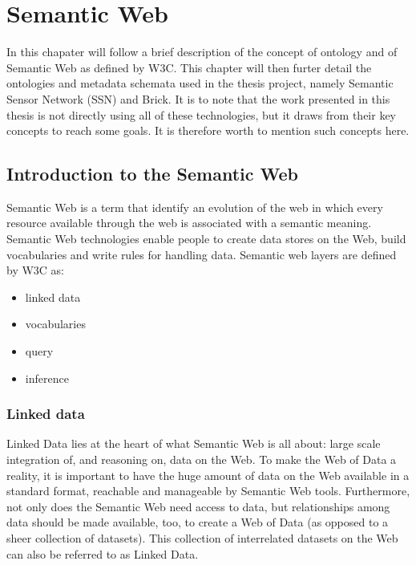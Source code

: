 \chapter{Semantic Web}
\label{ch:semantic_web}

\nocite{rdf_introduction}
In this chapater will follow a brief description of the concept of ontology and of Semantic Web as defined by W3C. This chapter will then furter detail the ontologies and metadata schemata used in the thesis project, namely Semantic Sensor Network (SSN) and Brick.
It is to note that the work presented in this thesis is not directly using all of these technologies, but it draws from their key concepts to reach some goals. It is therefore worth to mention such concepts here.

\section{Introduction to the Semantic Web}
Semantic Web is a term that identify an evolution of the web in which every resource available through the web is associated with a semantic meaning. Semantic Web technologies enable people to create data stores on the Web, build vocabularies and write rules for handling data.
Semantic web layers are defined by W3C as:
\begin{itemize}
  \item linked data
  \item vocabularies
  \item query
  \item inference
\end{itemize}

\subsection{Linked data}
Linked Data lies at the heart of what Semantic Web is all about: large scale integration of, and reasoning on, data on the Web. To make the Web of Data a reality, it is important to have the huge amount of data on the Web available in a standard format, reachable and manageable by Semantic Web tools. Furthermore, not only does the Semantic Web need access to data, but relationships among data should be made available, too, to create a Web of Data (as opposed to a sheer collection of datasets). This collection of interrelated datasets on the Web can also be referred to as Linked Data.

